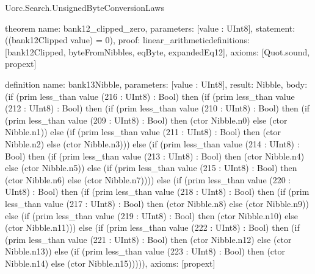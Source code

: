 \begin{lexlean}{Uorc.Search.UnsignedByteConversionLaws}
\begin{semanticmodule}
theorem{
  name: bank12_clipped_zero,
  parameters: [value : UInt8],
  statement: ((bank12Clipped value) = 0),
  proof: linear_arithmetic{definitions: [bank12Clipped, byteFromNibbles, eqByte, expandedEq12]},
  axioms: [Quot.sound, propext]
}

definition{
  name: bank13Nibble,
  parameters: [value : UInt8],
  result: Nibble,
  body: (if (prim less_than value (216 : UInt8) : Bool) then (if (prim less_than value (212 : UInt8) : Bool) then (if (prim less_than value (210 : UInt8) : Bool) then (if (prim less_than value (209 : UInt8) : Bool) then (ctor Nibble.n0) else (ctor Nibble.n1)) else (if (prim less_than value (211 : UInt8) : Bool) then (ctor Nibble.n2) else (ctor Nibble.n3))) else (if (prim less_than value (214 : UInt8) : Bool) then (if (prim less_than value (213 : UInt8) : Bool) then (ctor Nibble.n4) else (ctor Nibble.n5)) else (if (prim less_than value (215 : UInt8) : Bool) then (ctor Nibble.n6) else (ctor Nibble.n7)))) else (if (prim less_than value (220 : UInt8) : Bool) then (if (prim less_than value (218 : UInt8) : Bool) then (if (prim less_than value (217 : UInt8) : Bool) then (ctor Nibble.n8) else (ctor Nibble.n9)) else (if (prim less_than value (219 : UInt8) : Bool) then (ctor Nibble.n10) else (ctor Nibble.n11))) else (if (prim less_than value (222 : UInt8) : Bool) then (if (prim less_than value (221 : UInt8) : Bool) then (ctor Nibble.n12) else (ctor Nibble.n13)) else (if (prim less_than value (223 : UInt8) : Bool) then (ctor Nibble.n14) else (ctor Nibble.n15))))),
  axioms: [propext]
}


\end{semanticmodule}
\end{lexlean}
